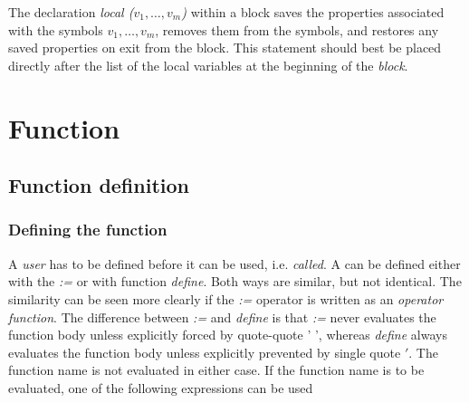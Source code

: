 \documentclass[../Maxima_Workbook.tex]{subfiles}
\begin{document}
\lzz {} \hfill \tcr{[function]}

\lz The declaration \emph{local ($ v_1,\dots,v_m $)} within a block saves the properties associated with the symbols $ v_1,\dots,v_m $, removes them from the symbols, and restores any saved properties on exit from the block. This statement should best be placed directly after the list of the local variables at the beginning of the \emph{block}.

\section{Function}\label{F1}

\subsection{Function definition}

\subsubsection{Defining the function}

\hyt{:=}{\tcr{\emph{:=}}} \hfill {}\index{:=}




\lzz {} \hfill \tcr{[function]}


\lz A \emph{user}  has to be defined before it can be used, i.e. \emph{called}. A  can be defined either with the  \emph{:=} or with function \emph{define}. Both ways are similar, but not identical. The similarity can be seen more clearly if the \emph{:=} operator is written as an \emph{operator function}. The difference between \emph{:=} and \emph{define} is that \emph{:=} never evaluates the function body unless explicitly forced by quote-quote ' ', whereas \emph{define} always evaluates the function body unless explicitly prevented by single quote $ ' $. The function name is not evaluated in either case. If the function name is to be evaluated, one of the following expressions can be used
\end{document}
